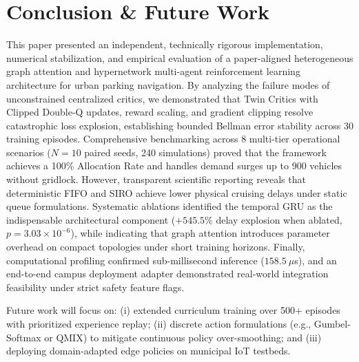 \documentclass[journal]{IEEEtran}
\begin{document}
\section{Conclusion \& Future Work}
\label{sec:conclusion}
This paper presented an independent, technically rigorous implementation, numerical stabilization, and empirical evaluation of a paper-aligned heterogeneous graph attention and hypernetwork multi-agent reinforcement learning architecture for urban parking navigation. By analyzing the failure modes of unconstrained centralized critics, we demonstrated that Twin Critics with Clipped Double-Q updates, reward scaling, and gradient clipping resolve catastrophic loss explosion, establishing bounded Bellman error stability across 30 training episodes. Comprehensive benchmarking across 8 multi-tier operational scenarios ($N=10$ paired seeds, 240 simulations) proved that the framework achieves a 100\% Allocation Rate and handles demand surges up to 900 vehicles without gridlock. However, transparent scientific reporting reveals that deterministic FIFO and SIRO achieve lower physical cruising delays under static queue formulations. Systematic ablations identified the temporal GRU as the indispensable architectural component ($+545.5\%$ delay explosion when ablated, $p = 3.03 \times 10^{-6}$), while indicating that graph attention introduces parameter overhead on compact topologies under short training horizons. Finally, computational profiling confirmed sub-millisecond inference ($158.5~\mu$s), and an end-to-end campus deployment adapter demonstrated real-world integration feasibility under strict safety feature flags.

Future work will focus on: (i) extended curriculum training over 500+ episodes with prioritized experience replay; (ii) discrete action formulations (e.g., Gumbel-Softmax or QMIX) to mitigate continuous policy over-smoothing; and (iii) deploying domain-adapted edge policies on municipal IoT testbeds.



\end{document}
